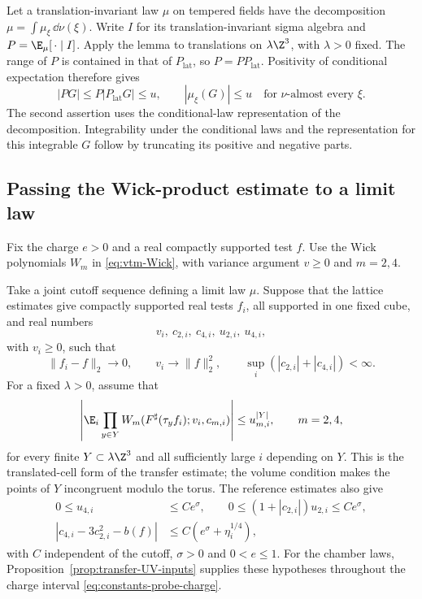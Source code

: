 Let a translation-invariant law $\mu$ on tempered fields have
the decomposition $\mu=\int\mu_\xi\,\dd\nu(\xi)$.
Write $I$ for its translation-invariant sigma algebra and
$P=\E_\mu[\,\cdot\mid I]$. Apply the lemma to translations
on $\lambda\Z^3$, with $\lambda>0$ fixed. The range of $P$
is contained in that of $P_{\mathrm{lat}}$, so
$P=PP_{\mathrm{lat}}$. Positivity of conditional expectation
therefore gives
\begin{equation}\label{eq:UV-component-product-bound}
 |PG|\le P|P_{\mathrm{lat}}G|\le u,\qquad
 |\mu_\xi(G)|\le u\quad\text{for }\nu\text{-almost every }\xi.
\end{equation}
The second assertion uses the conditional-law representation of
the decomposition. Integrability under the conditional laws and
the representation for this integrable $G$ follow by truncating
its positive and negative parts.

\subsection{Passing the Wick-product estimate to a limit law}

Fix the charge $e>0$ and a real compactly supported test $f$.
Use the Wick polynomials $W_m$ in \eqref{eq:vtm-Wick},
with variance argument $v\ge0$ and $m=2,4$.

Take a joint cutoff sequence defining a limit law $\mu$.
Suppose that the lattice estimates give compactly
supported real tests $f_i$, all supported in one fixed cube,
and real numbers
\[
 v_i,\ c_{2,i},\ c_{4,i},\ u_{2,i},\ u_{4,i},
\]
with
$v_i\ge0$, such that
\begin{equation}\label{eq:UV-test-convergence}
 \|f_i-f\|_2\to0,\qquad
 v_i\to\|f\|_2^2,\qquad
 \sup_i(|c_{2,i}|+|c_{4,i}|)<\infty.
\end{equation}
For a fixed $\lambda>0$, assume that
\begin{equation}\label{eq:UV-cutoff-product-bound}
 \left|\E_i\prod_{y\in Y}
       W_m(F^\sharp(\tau_y f_i);v_i,c_{m,i})\right|
                     \le u_{m,i}^{|Y|},\qquad m=2,4,
\end{equation}
for every finite $Y\subset\lambda\Z^3$ and all sufficiently
large $i$ depending on $Y$. This is the translated-cell form
of the transfer estimate; the volume condition makes the
points of $Y$ incongruent modulo the torus.
The reference estimates also give
\begin{equation}\label{eq:UV-reference-bounds}
 \begin{split}
 0\le u_{4,i}&\le Ce^\sigma,\qquad
 0\le(1+|c_{2,i}|)u_{2,i}\le Ce^\sigma,\\
 |c_{4,i}-3c_{2,i}^2-b(f)|
                  &\le C(e^\sigma+\eta_i^{1/4}),
 \end{split}
\end{equation}
with $C$ independent of the cutoff, $\sigma>0$ and $0<e\le1$.
For the chamber laws, Proposition~\ref{prop:transfer-UV-inputs}
supplies these hypotheses throughout the charge interval
\eqref{eq:constants-probe-charge}.

